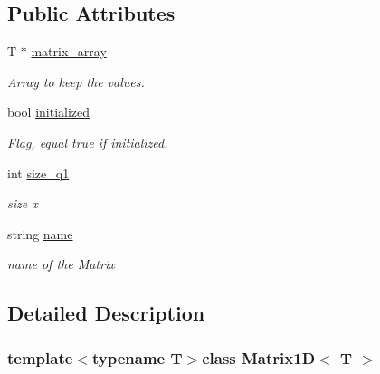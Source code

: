 \subsection*{Public Attributes}
\begin{DoxyCompactItemize}
\item 
\hypertarget{class_matrix1_d_a6c4711cac3cfe73ed88af1f813256aa6}{}T $\ast$ \hyperlink{class_matrix1_d_a6c4711cac3cfe73ed88af1f813256aa6}{matrix\+\_\+array}\label{class_matrix1_d_a6c4711cac3cfe73ed88af1f813256aa6}

\begin{DoxyCompactList}\small\item\em Array to keep the values. \end{DoxyCompactList}\item 
\hypertarget{class_matrix1_d_aa608b0a9d9984146125924120a4ad542}{}bool \hyperlink{class_matrix1_d_aa608b0a9d9984146125924120a4ad542}{initialized}\label{class_matrix1_d_aa608b0a9d9984146125924120a4ad542}

\begin{DoxyCompactList}\small\item\em Flag, equal true if initialized. \end{DoxyCompactList}\item 
\hypertarget{class_matrix1_d_a570f4a6b7df1811f2c3029ce026a6223}{}int \hyperlink{class_matrix1_d_a570f4a6b7df1811f2c3029ce026a6223}{size\+\_\+q1}\label{class_matrix1_d_a570f4a6b7df1811f2c3029ce026a6223}

\begin{DoxyCompactList}\small\item\em size x \end{DoxyCompactList}\item 
\hypertarget{class_matrix1_d_a1a5290c958b4bdc9ae76e57c1c7048c2}{}string \hyperlink{class_matrix1_d_a1a5290c958b4bdc9ae76e57c1c7048c2}{name}\label{class_matrix1_d_a1a5290c958b4bdc9ae76e57c1c7048c2}

\begin{DoxyCompactList}\small\item\em name of the Matrix \end{DoxyCompactList}\end{DoxyCompactItemize}


\subsection{Detailed Description}
\subsubsection*{template$<$typename T$>$class Matrix1\+D$<$ T $>$}

